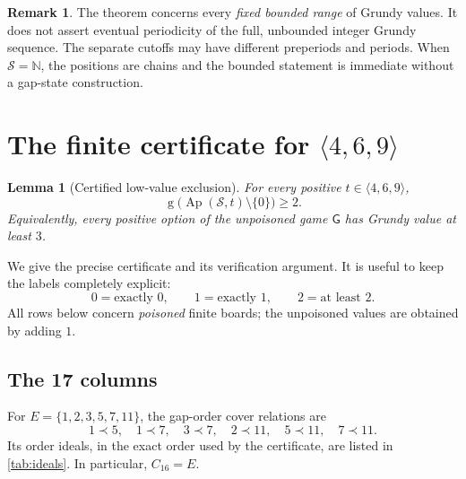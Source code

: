 \documentclass[11pt,letterpaper]{article}
\numberwithin{equation}{section}
\newtheorem{lemma}[theorem]{Lemma}
\theoremstyle{definition}
\newtheorem{remark}[theorem]{Remark}
\newcommand{\N}{\mathbb N}
\newcommand{\Sg}{\mathcal S}
\newcommand{\Gr}{\operatorname{g}}
\newcommand{\Ap}{\operatorname{Ap}}
\renewcommand{\Game}{\mathsf G}
\begin{document}
\begin{remark}
The theorem concerns every \emph{fixed bounded range} of Grundy values.
It does not assert eventual periodicity of the full, unbounded integer
Grundy sequence. The separate cutoffs may have different preperiods and
periods. When $\Sg=\N$, the positions are chains and the bounded statement
is immediate without a gap-state construction.
\end{remark}

\section{The finite certificate for \texorpdfstring{$\langle4,6,9\rangle$}{<4,6,9>}}
\label{sec:certificate}

\begin{lemma}[Certified low-value exclusion]\label{lem:certified}
For every positive $t\in\langle4,6,9\rangle$,
\begin{equation}\label{eq:certified}
 \Gr\bigl(\Ap(\Sg,t)\setminus\{0\}\bigr)\geq2.
\end{equation}
Equivalently, every positive option of the unpoisoned game $\Game$ has
Grundy value at least $3$.
\end{lemma}

We give the precise certificate and its verification argument. It is useful
to keep the labels completely explicit:
\[
 \boxed{\quad 0=\text{exactly }0,\qquad
 1=\text{exactly }1,\qquad 2=\text{at least }2.\quad}
\]
All rows below concern \emph{poisoned} finite boards; the unpoisoned values
are obtained by adding $1$.

\subsection{The 17 columns}

For $E=\{1,2,3,5,7,11\}$, the gap-order cover relations are
\[
 1\prec5,\quad1\prec7,\quad3\prec7,\quad
 2\prec11,\quad5\prec11,\quad7\prec11.
\]
Its order ideals, in the exact order used by the certificate, are listed in
\cref{tab:ideals}. In particular, $C_{16}=E$.
\end{document}
